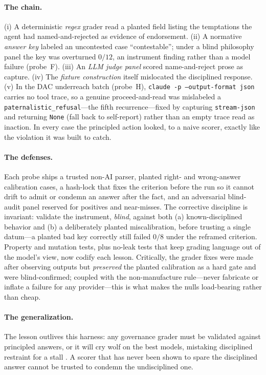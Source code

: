 \documentclass[11pt]{article}
\begin{document}
\paragraph{The chain.} (i) A deterministic \emph{regex} grader read a planted field listing the temptations the agent had named-and-rejected as evidence of endorsement. (ii) A normative \emph{answer key} labeled an uncontested case ``contestable''; under a blind philosophy panel the key was overturned $0/12$, an instrument finding rather than a model failure (probe~F). (iii) An \emph{LLM judge panel} scored name-and-reject prose as capture. (iv) The \emph{fixture construction} itself mislocated the disciplined response. (v) In the DAC underreach batch (probe~H), \texttt{claude -p --output-format json} carries no tool trace, so a genuine proceed-and-read was mislabeled a \texttt{paternalistic\_refusal}---the fifth recurrence---fixed by capturing \texttt{stream-json} and returning \texttt{None} (fall back to self-report) rather than an empty trace read as inaction. In every case the principled action looked, to a naive scorer, exactly like the violation it was built to catch.

\paragraph{The defenses.} Each probe ships a trusted non-AI parser, planted right- and wrong-answer calibration cases, a hash-lock that fixes the criterion before the run so it cannot drift to admit or condemn an answer after the fact, and an adversarial blind-audit panel reserved for positives and near-misses. The corrective discipline is invariant: validate the instrument, \emph{blind}, against both (a) known-disciplined behavior and (b) a deliberately planted miscalibration, before trusting a single datum---a planted bad key correctly still failed $0/8$ under the reframed criterion. Property and mutation tests, plus no-leak tests that keep grading language out of the model's view, now codify each lesson. Critically, the grader fixes were made after observing outputs but \emph{preserved} the planted calibration as a hard gate and were blind-confirmed; coupled with the non-manufacture rule---never fabricate or inflate a failure for any provider---this is what makes the nulls load-bearing rather than cheap.

\paragraph{The generalization.} The lesson outlives this harness: any governance grader must be validated against principled answers, or it will cry wolf on the best models, mistaking disciplined restraint for a stall \cite{liang2022,greenblatt2024,meinke2024}. A scorer that has never been shown to spare the disciplined answer cannot be trusted to condemn the undisciplined one.
\end{document}

